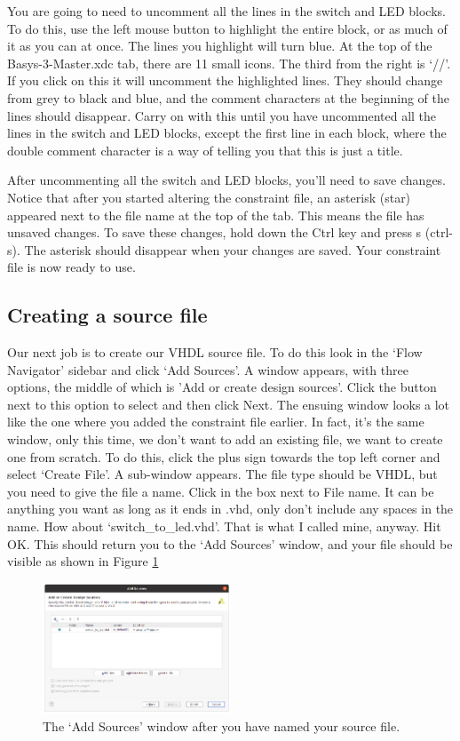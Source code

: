 \documentclass[../physical_computing.tex]{subfiles}
\begin{document}
You are going to need to uncomment all the lines in the switch and LED blocks. To do this, use the left mouse button to highlight the entire block, or as much of it as you can at once. The lines you highlight will turn blue. At the top of the Basys-3-Master.xdc tab, there are 11 small icons. The third from the right is `//'. If you click on this it will uncomment the highlighted lines. They should change from grey to black and blue, and the comment characters at the beginning of the lines should disappear. Carry on with this until you have uncommented all the lines in the switch and LED blocks, except the first line in each block, where the double comment character is a way of telling you that this is just a title.

After uncommenting all the switch and LED blocks, you'll need to save changes. Notice that after you started altering the constraint file, an asterisk (star) appeared next to the file name at the top of the tab. This means the file has unsaved changes. To save these changes, hold down the Ctrl key and press s (ctrl-s). The asterisk should disappear when your changes are saved. Your constraint file is now ready to use.

\subsection{Creating a source file}
\label{sec:sourcefile}

Our next job is to create our VHDL source file. To do this look in the `Flow Navigator' sidebar and click `Add Sources'. A window appears, with three options, the middle of which is 'Add or create design sources'. Click the button next to this option to select and then click Next. The ensuing window looks a lot like the one where you added the constraint file earlier. In fact, it's the same window, only this time, we don't want to add an existing file, we want to create one from scratch. To do this, click the plus sign towards the top left corner and select `Create File'. A sub-window appears. The file type should be VHDL, but you need to give the file a name. Click in the box next to File name. It can be anything you want as long as it ends in .vhd, only don't include any spaces in the name. How about `switch\_to\_led.vhd'. That is what I called mine, anyway. Hit OK. This should return you to the `Add Sources' window, and your file should be visible as shown in Figure \ref{fig:add_sources}

\begin{figure}[htbp]
    \centering
    \includegraphics[width=0.5\textwidth]{figures/add_sources.png}
    \caption{The `Add Sources' window after you have named your source file.}
    \label{fig:add_sources}
\end{figure}
\end{document}
